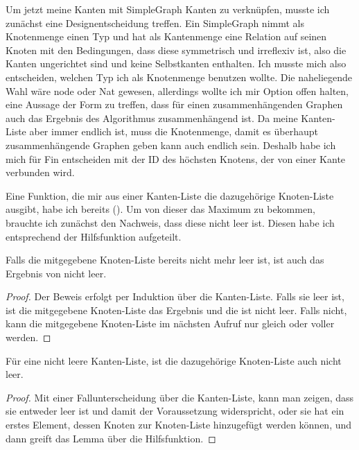Um jetzt meine Kanten mit SimpleGraph Kanten zu verknüpfen, musste ich zunächst eine Designentscheidung treffen.
Ein SimpleGraph nimmt als Knotenmenge einen Typ und hat als Kantenmenge eine Relation auf seinen Knoten mit den Bedingungen,
dass diese symmetrisch und irreflexiv ist, also die Kanten ungerichtet sind und keine Selbstkanten enthalten.
Ich musste mich also entscheiden, welchen Typ ich als Knotenmenge benutzen wollte.
Die naheliegende Wahl wäre node oder Nat gewesen, allerdings wollte ich mir Option offen halten, eine Aussage der Form zu treffen,
dass für einen zusammenhängenden Graphen auch das Ergebnis des Algorithmus zusammenhängend ist.
Da meine Kanten-Liste aber immer endlich ist, muss die Knotenmenge, damit es überhaupt zusammenhängende Graphen geben kann auch endlich sein.
Deshalb habe ich mich für Fin entscheiden mit der ID des höchsten Knotens, der von einer Kante verbunden wird.

Eine Funktion, die mir aus einer Kanten-Liste die dazugehörige Knoten-Liste ausgibt, habe ich bereits (\KruskalnodeListofedgeList).
Um von dieser das Maximum zu bekommen, brauchte ich zunächst den Nachweis, dass diese nicht leer ist.
Diesen habe ich entsprechend der Hilfsfunktion aufgeteilt.

\begin{lemma}[\KruskalnodeListofedgeListhelpernonempty]
  Falls die mitgegebene Knoten-Liste bereits nicht mehr leer ist, ist auch das Ergebnis von \KruskalnodeListofedgeListhelper nicht leer.
\end{lemma}
\begin{proof}
  Der Beweis erfolgt per Induktion über die Kanten-Liste.
  Falls sie leer ist, ist die mitgegebene Knoten-Liste das Ergebnis und die ist nicht leer.
  Falls nicht, kann die mitgegebene Knoten-Liste im nächsten Aufruf nur gleich oder voller werden.
\end{proof}



\begin{lemma}[\KruskalnodeListofedgeListnonempty]
  Für eine nicht leere Kanten-Liste, ist die dazugehörige Knoten-Liste auch nicht leer.
\end{lemma}
\begin{proof}
  Mit einer Fallunterscheidung über die Kanten-Liste, kann man zeigen, dass sie entweder leer ist und damit der Voraussetzung widerspricht,
  oder sie hat ein erstes Element, dessen Knoten zur Knoten-Liste hinzugefügt werden können, und dann greift das Lemma über die Hilfsfunktion.
\end{proof}

